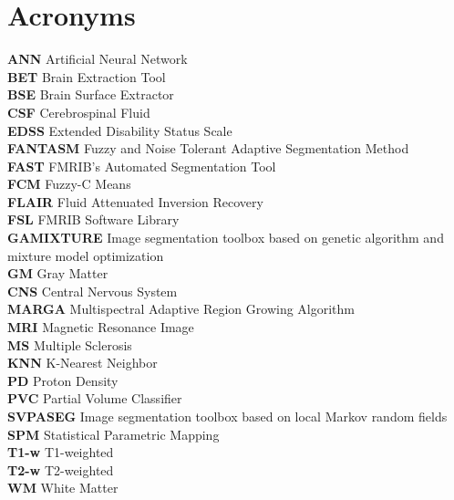 
\chapter*{Acronyms}

\textbf{ANN} Artificial Neural Network\\
\textbf{BET} Brain Extraction Tool\\
\textbf{BSE} Brain Surface Extractor\\
\textbf{CSF} Cerebrospinal Fluid\\
\textbf{EDSS} Extended Disability Status Scale\\
\textbf{FANTASM} Fuzzy and Noise Tolerant Adaptive Segmentation Method\\
\textbf{FAST} FMRIB's Automated Segmentation Tool\\
\textbf{FCM} Fuzzy-C Means \\
\textbf{FLAIR} Fluid Attenuated Inversion Recovery\\
\textbf{FSL} FMRIB Software Library\\
\textbf{GAMIXTURE} Image segmentation toolbox based on genetic algorithm and mixture model optimization\\
\textbf{GM} Gray Matter\\
\textbf{CNS} Central Nervous System\\
\textbf{MARGA} Multispectral Adaptive Region Growing Algorithm \\
\textbf{MRI} Magnetic Resonance Image\\
\textbf{MS} Multiple Sclerosis\\
\textbf{KNN} K-Nearest Neighbor \\
\textbf{PD} Proton Density\\
\textbf{PVC} Partial Volume Classifier \\
\textbf{SVPASEG} Image segmentation toolbox based on local Markov random fields\\
\textbf{SPM} Statistical Parametric Mapping\\
\textbf{T1-w} T1-weighted\\
\textbf{T2-w} T2-weighted\\
\textbf{WM} White Matter\\











